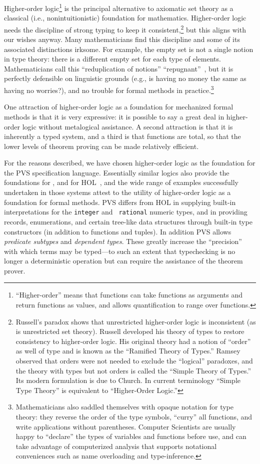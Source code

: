 {Higher-order logic\footnote{``Higher-order'' means that functions can
take functions as arguments and return functions as values, and
allows quantification to range over functions.} is the principal
alternative to axiomatic set theory as a classical (i.e.,
nonintuitionistic) foundation for mathematics.  Higher-order logic
needs the discipline of strong typing to keep it
consistent,\footnote{Russell's paradox shows that unrestricted
higher-order logic is inconsistent (as is unrestricted set theory).
Russell developed his theory of types to restore consistency to
higher-order logic.  His original theory had a notion of ``order'' as
well of type and is known as the ``Ramified Theory of Types.''
Ramsey observed that orders were not needed to exclude the
``logical'' paradoxes, and the theory with types but not orders is
called the ``Simple Theory of Types.''  Its modern formulation is due
to Church.  In current terminology ``Simple Type Theory'' is
equivalent to ``Higher-Order Logic.''} but this aligns with our
wishes anyway.  Many mathematicians find this discipline and some of
its associated distinctions irksome.  For example, the empty set is
not a single notion in type theory: there is a different empty set
for each type of elements.  Mathematicians call this ``reduplication
of notions'' ``repugnant''~\cite{Fraenkel-etal84}, but it is
perfectly defensible on linguistic grounds (e.g., is having no money
the same as having no worries?), and no trouble for formal methods in
practice.\footnote{Mathematicians also saddled themselves with opaque
notation for type theory: they reverse the order of the type symbols,
``curry'' all functions, and write applications without parentheses.
Computer Scientists are usually happy to ``declare'' the types of
variables and functions before use, and can take advantage of
computerized analysis that supports notational conveniences such as
name overloading and type-inference.}

One attraction of higher-order logic as a foundation for mechanized
formal methods is that it is very expressive: it is possible to say
a great deal in higher-order logic without metalogical assistance.
A second attraction is that it is inherently a typed system, and a
third is that functions are total, so that the lower levels of
theorem proving can be made relatively efficient.

For the reasons described, we have chosen higher-order logic as the
foundation for the PVS specification language.  Essentially similar
logics also provide the foundations for \ehdm, and for
HOL~\cite{Gordon:HOL88}, and the wide range of examples successfully
undertaken in those systems attest to the utility of higher-order
logic as a foundation for formal methods.  PVS differs from HOL in
supplying built-in interpretations for the {\tt integer} and {\tt
rational} numeric types, and in providing records, enumerations, and
certain tree-like data structures through built-in type constructors
(in addition to functions and tuples).  In addition PVS allows {\em
predicate subtypes\/} and {\em dependent types\/}.  These greatly
increase the ``precision'' with which terms may be typed---to such an
extent that typechecking is no longer a deterministic operation but
can require the assistance of the theorem prover.

}
